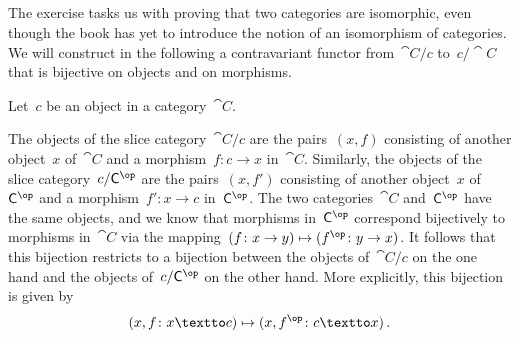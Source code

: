 \subsection{}

The exercise tasks us with proving that two categories are isomorphic, even though the book has yet to introduce the notion of an isomorphism of categories.
We will construct in the following a contravariant functor from~$\cat{C} / c$ to~$c / \cat{C}$ that is bijective on objects and on morphisms.

Let~$c$ be an object in a category~$\cat{C}$.

The objects of the slice category~$\cat{C} / c$ are the pairs~$(x, f)$ consisting of another object~$x$ of~$\cat{C}$ and a morphism~$f \colon c \to x$ in~$\cat{C}$.
Similarly, the objects of the slice category~$c / \cat{C}^{\op}$ are the pairs~$(x, f')$ consisting of another object~$x$ of~$\cat{C}^{\op}$ and a morphism~$f' \colon x \to c$ in~$\cat{C}^{\op}$.
The two categories~$\cat{C}$ and~$\cat{C}^{\op}$ have the same objects, and we know that morphisms in~$\cat{C}^{\op}$ correspond bijectively to morphisms in~$\cat{C}$ via the mapping~$(f \colon x \to y) \mapsto (f^{\op} \colon y \to x)$.
It follows that this bijection restricts to a bijection between the objects of~$\cat{C} / c$ on the one hand and the objects of~$c / \cat{C}^{\op}$ on the other hand.
More explicitly, this bijection is given by
\[
	(x, f \colon x \textto c)
	\mapsto
	(x, f^{\op} \colon c \textto x) \,.
\]

